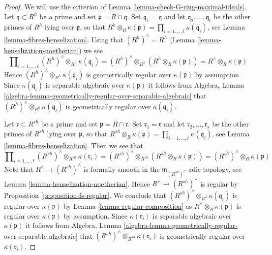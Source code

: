 \begin{proof}
We will use the criterion of Lemma \ref{lemma-check-G-ring-maximal-ideals}.
Let $\mathfrak q \subset R^h$ be a prime and set
$\mathfrak p = R \cap \mathfrak q$. Set $\mathfrak q_1 = \mathfrak q$
and let $\mathfrak q_2, \ldots, \mathfrak q_t$
be the other primes of $R^h$ lying over $\mathfrak p$, so that
$R^h \otimes_R \kappa(\mathfrak p) =
\prod\nolimits_{i = 1, \ldots, t} \kappa(\mathfrak q_i)$, see
Lemma \ref{lemma-fibres-henselization}.
Using that $(R^h)^\wedge = R^\wedge$
(Lemma \ref{lemma-henselization-noetherian}) we see
$$
\prod\nolimits_{i = 1, \ldots, t}
(R^h)^\wedge \otimes_{R^h} \kappa(\mathfrak q_i) =
(R^h)^\wedge \otimes_{R^h} (R^h \otimes_R \kappa(\mathfrak p)) =
R^\wedge \otimes_R \kappa(\mathfrak p)
$$
Hence $(R^h)^\wedge \otimes_{R^h} \kappa(\mathfrak q_i)$
is geometrically regular over $\kappa(\mathfrak p)$ by assumption.
Since $\kappa(\mathfrak q_i)$ is separable algebraic over $\kappa(\mathfrak p)$
it follows from Algebra, Lemma
\ref{algebra-lemma-geometrically-regular-over-separable-algebraic} that
$(R^h)^\wedge \otimes_{R^h} \kappa(\mathfrak q_i)$ is
geometrically regular over $\kappa(\mathfrak q_i)$.

\medskip\noindent
Let $\mathfrak r \subset R^{sh}$ be a prime and set
$\mathfrak p = R \cap \mathfrak r$. Set $\mathfrak r_1 = \mathfrak r$
and let $\mathfrak r_2, \ldots, \mathfrak r_s$
be the other primes of $R^{sh}$ lying over $\mathfrak p$, so that
$R^{sh} \otimes_R \kappa(\mathfrak p) =
\prod\nolimits_{i = 1, \ldots, t} \kappa(\mathfrak q_i)$, see
Lemma \ref{lemma-fibres-henselization}.
Then we see that
$$
\prod\nolimits_{i = 1, \ldots, t}
(R^{sh})^\wedge \otimes_{R^{sh}} \kappa(\mathfrak r_i) =
(R^{sh})^\wedge \otimes_{R^{sh}} (R^{sh} \otimes_R \kappa(\mathfrak p)) =
(R^{sh})^\wedge \otimes_R \kappa(\mathfrak p)
$$
Note that $R^\wedge \to (R^{sh})^\wedge$ is formally smooth
in the $\mathfrak m_{(R^{sh})^\wedge}$-adic topology, see
Lemma \ref{lemma-henselization-noetherian}.
Hence $R^\wedge \to (R^{sh})^\wedge$ is regular by
Proposition \ref{proposition-fs-regular}.
We conclude that $(R^{sh})^\wedge \otimes_{R^h} \kappa(\mathfrak q_i)$
is regular over $\kappa(\mathfrak p)$ by
Lemma \ref{lemma-regular-composition} as
$R^\wedge \otimes_R \kappa(\mathfrak p)$ is regular over $\kappa(\mathfrak p)$
by assumption. Since $\kappa(\mathfrak r_i)$ is separable algebraic over
$\kappa(\mathfrak p)$
it follows from Algebra, Lemma
\ref{algebra-lemma-geometrically-regular-over-separable-algebraic} that
$(R^{sh})^\wedge \otimes_{R^{sh}} \kappa(\mathfrak r_i)$ is
geometrically regular over $\kappa(\mathfrak r_i)$.
\end{proof}

